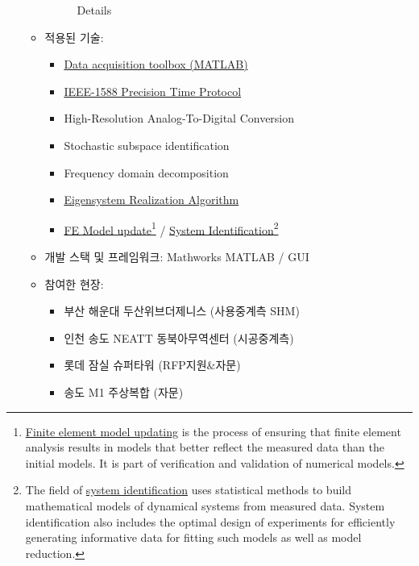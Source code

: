 \begin{itemize}[label=]
\begin{itemize}[label=]
\begin{figure}[ht]
\begin{fullwidth}
{					            \caption*{Details}
				            }
			            \end{fullwidth}
		            \end{figure}
		      \item 적용된 기술:
		            \begin{itemize}
			            \item \href{http://kr.mathworks.com/products/daq/}{Data acquisition toolbox (MATLAB)}
			            \item \href{https://ko.wikipedia.org/wiki/IEEE_1588}{IEEE-1588 Precision Time Protocol}
			            \item High-Resolution Analog-To-Digital Conversion
			            \item Stochastic subspace identification
			            \item Frequency domain decomposition
			            \item \href{https://en.wikipedia.org/wiki/Eigensystem_realization_algorithm}{Eigensystem Realization Algorithm}
			            \item \href{https://en.wikipedia.org/wiki/Finite_element_updating}{FE Model update}\footnote{\href{https://en.wikipedia.org/wiki/Finite_element_updating}{Finite element model updating} is the process of ensuring that finite element analysis results in models that better reflect the measured data than the initial models. It is part of verification and validation of numerical models.} / \href{https://en.wikipedia.org/wiki/System_identification}{System Identification}\footnote{The field of \href{https://en.wikipedia.org/wiki/System_identification}{system identification} uses statistical methods to build mathematical models of dynamical systems from measured data. System identification also includes the optimal design of experiments for efficiently generating informative data for fitting such models as well as model reduction.}
		            \end{itemize}
		      \item 개발 스택 및 프레임워크: Mathworks MATLAB / GUI
		      \item 참여한 현장:
		            \begin{itemize}
			            \item 부산 해운대 두산위브더제니스 (사용중계측 SHM)
			            \item 인천 송도 NEATT 동북아무역센터 (시공중계측)
			            \item 롯데 잠실 슈퍼타워 (RFP지원\&자문)
			            \item 송도 M1 주상복합 (자문)
		            \end{itemize}
	      \end{itemize}
\end{itemize}

